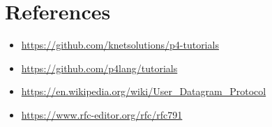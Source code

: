 \documentclass[a4paper,11pt]{article}
\begin{document}

\section{References}
\begin{itemize}
    \item \href{https://github.com/knetsolutions/p4-tutorials}{https://github.com/knetsolutions/p4-tutorials}
    \item \href{https://github.com/p4lang/tutorials}{https://github.com/p4lang/tutorials}
    \item \href{https://en.wikipedia.org/wiki/User\_Datagram\_Protocol}{https://en.wikipedia.org/wiki/User\_Datagram\_Protocol}
    \item \href{https://www.rfc-editor.org/rfc/rfc791}{https://www.rfc-editor.org/rfc/rfc791}
\end{itemize}
\end{document}

